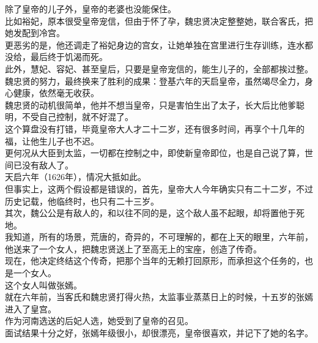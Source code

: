 \begin{multicols}{\theparacolNo}
除了皇帝的儿子外，皇帝的老婆也没能保住。\\

比如裕妃，原本很受皇帝宠信，但由于怀了孕，魏忠贤决定整整她，联合客氏，把她发配到冷宫。\\

更恶劣的是，他还调走了裕妃身边的宫女，让她单独在宫里进行生存训练，连水都没给，最后终于饥渴而死。\\

此外，慧妃、容妃、甚至皇后，只要是皇帝宠信的，能生儿子的，全部都挨过整。\\

魏忠贤的努力，最终换来了胜利的成果：登基六年的天启皇帝，虽然竭尽全力，身心健康，依然毫无收获。\\

魏忠贤的动机很简单，他并不想当皇帝，只是害怕生出了太子，长大后比他爹聪明，不受自己控制，就不好混了。\\

这个算盘没有打错，毕竟皇帝大人才二十二岁，还有很多时间，再享个十几年的福，让他生儿子也不迟。\\

更何况从大臣到太监，一切都在控制之中，即使新皇帝即位，也是自己说了算，世间已没有敌人了。\\

天启六年（1626年），情况大抵如此。\\

但事实上，这两个假设都是错误的，首先，皇帝大人今年确实只有二十二岁，不过历史记载，他临终时，也只有二十三岁。\\

其次，魏公公是有敌人的，和以往不同的是，这个敌人虽不起眼，却将置他于死地。\\

我知道，所有的场景，荒唐的，奇异的，不可理解的，都在上天的眼里，六年前，他送来了一个女人，把魏忠贤送上了至高无上的宝座，创造了传奇。\\

现在，他决定终结这个传奇，把那个当年的无赖打回原形，而承担这个任务的，也是一个女人。\\

这个女人叫做张嫣。\\

就在六年前，当客氏和魏忠贤打得火热，太监事业蒸蒸日上的时候，十五岁的张嫣进入了皇宫。\\

作为河南选送的后妃人选，她受到了皇帝的召见。\\

面试结果十分之好，张嫣年级很小，却很漂亮，皇帝很喜欢，并记下了她的名字。\\


\end{multicols}
